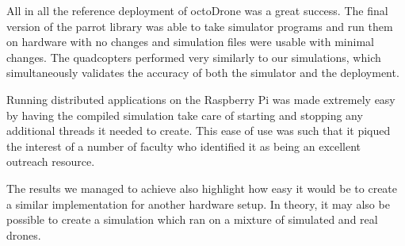 All in all the reference deployment of octoDrone was a great success. The final version of the parrot library was able to take simulator programs and run them on hardware with no changes and simulation files were usable with minimal changes. The quadcopters performed very similarly to our simulations, which simultaneously validates the accuracy of both the simulator and the deployment.

Running distributed applications on the Raspberry Pi was made extremely easy by having the compiled simulation take care of starting and stopping any additional threads it needed to create. This ease of use was such that it piqued the interest of a number of faculty who identified it as being an excellent outreach resource.

The results we managed to achieve also highlight how easy it would be to create a similar implementation for another hardware setup. In theory, it may also be possible to create a simulation which ran on a mixture of simulated and real drones. 